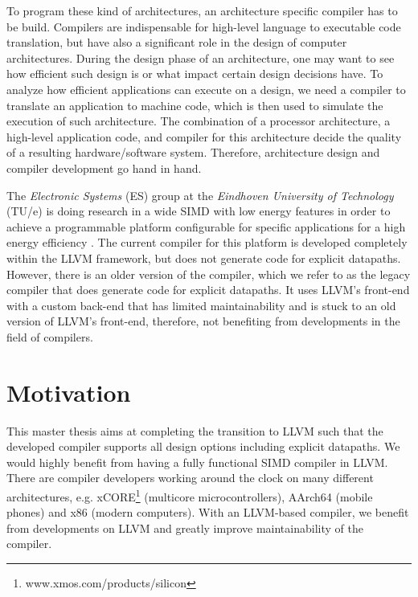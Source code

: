 To program these kind of architectures, an architecture specific compiler has to be build. Compilers are indispensable for high-level language to executable code translation, but have also a significant role in the design of computer architectures. During the design phase of an architecture, one may want to see how efficient such design is or what impact certain design decisions have. To analyze how efficient applications can execute on a design, we need a compiler to translate an application to machine code, which is then used to simulate the execution of such architecture. The combination of a processor architecture, a high-level application code, and compiler for this architecture decide the quality of a resulting hardware/software system. Therefore, architecture design and compiler development go hand in hand.  

The \emph{Electronic Systems} (ES) group at the \emph{Eindhoven University of Technology} (TU/e) is doing research in a wide SIMD with low energy features in order to achieve a programmable platform configurable for specific applications for a high energy efficiency \cite{dongrio1}. The current compiler for this platform is developed completely within the LLVM framework, but does not generate code for explicit datapaths. However, there is an older version of the compiler, which we refer to as the legacy compiler that does generate code for explicit datapaths. It uses LLVM's front-end with a custom back-end that has limited maintainability and is stuck to an old version of LLVM's front-end, therefore, not benefiting from developments in the field of compilers.

\section{Motivation}
This master thesis aims at completing the transition to LLVM such that the developed compiler supports all design options including explicit datapaths. %
We would highly benefit from having a fully functional SIMD compiler in LLVM. There are compiler developers working around the clock on many different architectures, e.g. xCORE\footnote{www.xmos.com/products/silicon} (multicore microcontrollers), AArch64 (mobile phones) and x86 (modern computers). With an LLVM-based compiler, we benefit from developments on LLVM and greatly improve maintainability of the compiler.

